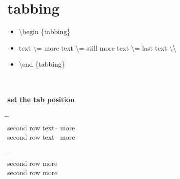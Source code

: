 \documentclass[12pt, a4paper, oneside]{book}
\let\stdsection\section
\renewcommand\section{\newpage\stdsection}
\begin{document}

\section{tabbing}


		\begin{boxedminipage}[c,fboxrule=10pt,fboxsep=12pt]{1.0\linewidth}
		\begin{itemize}
		\item[]	\textbackslash begin \{tabbing\}
		\item[]	text \textbackslash = more text \textbackslash = still more text \textbackslash = last text \textbackslash\textbackslash 
		\item[]	\textbackslash end \{tabbing\}
		\end{itemize}
		\end{boxedminipage} \\


		\paragraph{set the tab position}


		\begin{tabbing}
		\hspace{2cm}	\= \hspace{2cm}	\= \hspace{2cm}	\\
		second row 	\> text-- 	\> more \\
		second row 	\> text-- 	\> more \\
		\end{tabbing}

		\begin{tabbing}
		\hspace{2cm}	\=\hspace{2cm}	\=\hspace{2cm}\\
		second row 	\>  		\> more \\
		second row 	\>  		\> more \\
		\end{tabbing}
\end{document}
